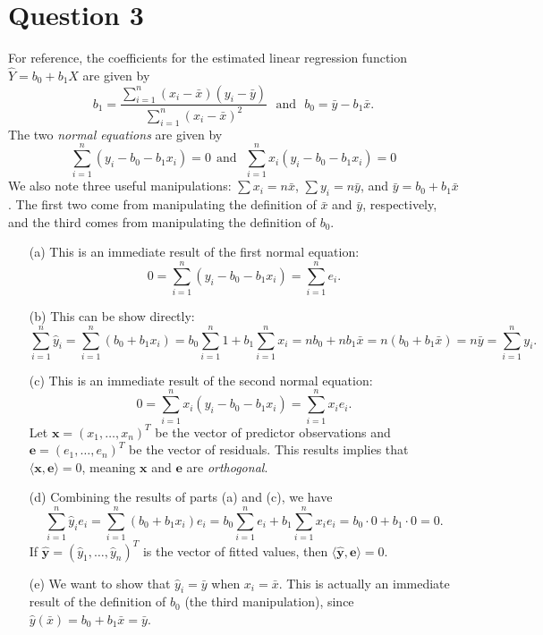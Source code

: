 \documentclass[10pt]{article}
\begin{document}
\section{Question 3} \noindent
For reference, the coefficients for the estimated linear regression function \(\hat{Y} = b_0 + b_1 X\) are
given by \[b_1 = \frac{\sum_{i=1}^n (x_i - \bar{x})(y_i - \bar{y})}{\sum_{i=1}^n(x_i - \bar{x})^2} ~~~\text{and}~~~ b_0 = \bar{y} - b_1 \bar{x}.\] 
The two \textit{normal equations} are given by 
\[
    \sum_{i=1}^{n} \left( y_i - b_0 - b_1 x_i \right) = 0 ~~\text{and}~~~ \sum_{i=1}^{n} x_i \left( y_i - b_0 - b_1 x_i \right) = 0
\]
We also note three useful manipulations:
\(\sum x_i = n \bar{x}\), \(\sum y_i = n \bar{y}\), and \(\bar{y} = b_0 + b_1 \bar{x}\).
The first two come from manipulating the definition of \(\bar{x}\) and \(\bar{y}\), respectively, and the third comes from manipulating the 
definition of \(b_0\).
\begin{itemize}
    \item[(a)] This is an immediate result of the first normal equation: 
    \[
        0 = \sum_{i=1}^{n} \left( y_i - b_0 - b_1 x_i \right) = \sum_{i=1}^n e_i.
    \]
    \item[(b)] This can be show directly:
    \[
        \sum_{i=1}^n \hat{y}_i = \sum_{i=1}^n \left( b_0 + b_1 x_i \right) = b_0 \sum_{i=1}^n 1 + b_1 \sum_{i=1}^n x_i
        = n b_0 + n b_1 \bar{x} = n(b_0 + b_1 \bar{x}) = n \bar{y} = \sum_{i=1}^n y_i.
    \]
    \item[(c)] This is an immediate result of the second normal equation:
    \[
        0 = \sum_{i=1}^{n} x_i \left( y_i - b_0 - b_1 x_i \right) = \sum_{i=1}^n x_i e_i.
    \]
    Let \(\mathbf{x} = (x_1,\ldots,x_n)^T\) be the vector of predictor observations and 
    \(\mathbf{e} = (e_1,\ldots,e_n)^T\) be the vector of residuals. This results implies that \(\langle\mathbf{x},\mathbf{e}\rangle = 0\), meaning
    \(\mathbf{x}\) and \(\mathbf{e}\) are \textit{orthogonal}.
    \item[(d)] Combining the results of parts (a) and (c), we have 
    \[
        \sum_{i=1}^n \hat{y}_i e_i = \sum_{i=1}^n \left( b_0 + b_1 x_i \right) e_i = b_0 \sum_{i=1}^n e_i + b_1 \sum_{i=1}^n x_i e_i
        = b_0 \cdot 0 + b_1 \cdot 0 = 0.
    \]
    If \(\hat{\mathbf{y}} = (\hat{y}_1,\ldots,\hat{y}_n)^T\) is the vector of fitted values, then \(\langle\hat{\mathbf{y}},\mathbf{e}\rangle=0\).
    \item[(e)] We want to show that \(\hat{y}_i = \bar{y}\) when \(x_i = \bar{x}\). This is actually an immediate result of the definition of \(b_0\)
    (the third manipulation), since 
    \(\hat{y}(\bar{x}) = b_0 + b_1 \bar{x} = \bar{y}\).
\end{itemize}
\end{document}
